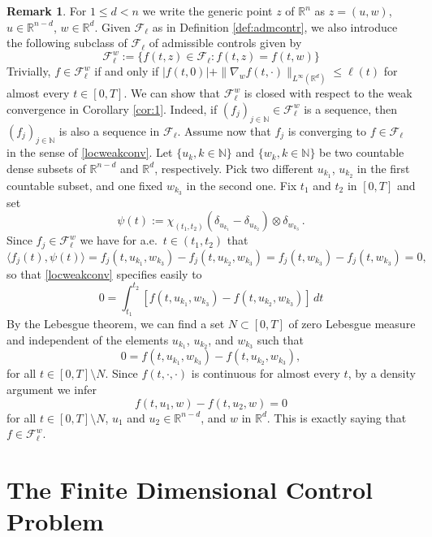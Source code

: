 \documentclass[11pt]{article}
\theoremstyle{plain}
\theoremstyle{definition}
\newtheorem{remark}[theorem]{Remark}
\theoremstyle{remark}
\numberwithin{equation}{section}
\newcommand{\R}{{\mathbb R}}
\newcommand{\Rn}{{\R}^n}
\begin{document}
\begin{remark}
For $1\le d<n$ we write the generic point $z$ of $\Rn$ as $z=(u,w)$,
$u \in \R^{n-d}$, $w\in \mathbb R^d$. Given $\mathcal F_\ell$ as in Definition \ref{def:admcontr}, we also introduce the following subclass of $\mathcal F_\ell$ of admissible controls given by
\begin{equation}\label{def2}
\mathcal F^w_\ell := \{ f(t,z) \in \mathcal F_\ell: f(t,z) = f(t,w) \}
\end{equation}
Trivially, $f \in \mathcal F_\ell^w$ if and only if $|f(t,0)| + \|\nabla_w f(t,\cdot)\|_{L^\infty(\mathbb R^d)} \leq \ell(t)$ for almost
every $t \in [0,T]$. We can show that $\mathcal F_\ell^w$ is closed  with respect to the weak convergence in Corollary \ref{cor:1}. Indeed, if $(f_j)_{j \in \mathbb N} \in \mathcal F_\ell^w$ is a sequence, then $(f_j)_{j \in \mathbb N}$ is also a sequence in $\mathcal F_\ell$. Assume now that $f_j$ is converging to $f \in \mathcal F_\ell$ in the sense of \eqref{locweakconv}. Let $\{u_k, k \in \mathbb N \}$ and $\{w_k, k \in \mathbb N \}$ be two countable dense subsets of $\R^{n-d}$ and $\R^d$, respectively. Pick two different $u_{k_1}$, $u_{k_2}$ in the first countable subset, and one fixed $w_{k_3}$ in the second one. Fix $t_1$ and $t_2$ in $[0, T]$ and set 
$$
\psi(t):=\chi_{(t_1, t_2)}(\delta_{u_{k_1}}-\delta_{u_{k_2}})\otimes \delta_{w_{k_3}}\,.
$$ 
Since $f_j \in \mathcal F_\ell^w$ we have for a.e.\ $t\in (t_1, t_2)$ that 
$$
\langle f_j(t), \psi(t)\rangle= f_j(t, u_{k_1}, w_{k_3})-f_j(t, u_{k_2}, w_{k_3})=f_j(t, w_{k_3})-f_j(t,w_{k_3})=0,
$$ 
so that \eqref{locweakconv} specifies easily to 
$$
0=\int_{t_1}^{t_2}[f(t,u_{k_1},w_{k_3}) - f(t,u_{k_2},w_{k_3})]\,dt
$$
By the Lebesgue theorem, we can find a set $N \subset [0,T]$ of zero Lebesgue measure and independent of the elements $u_{k_1}$, $u_{k_2}$, and $w_{k_3}$ such that
$$
0=f(t,u_{k_1},w_{k_3}) - f(t,u_{k_2},w_{k_3}),
$$
for all $t \in [0,T]\setminus N$. Since $f(t,\cdot, \cdot)$ is continuous for almost every $t$, by a density argument we infer
$$
f(t, u_1, w)-f(t, u_2, w)=0
$$
for all $t \in [0,T]\setminus N$, $u_1$ and  $u_2\in \R^{n-d}$, and $w$ in $\R^d$. This is exactly saying that $f\in \mathcal F_\ell^w$.
\end{remark}


\section{The Finite Dimensional Control Problem}\label{sec:finite}
\end{document}
